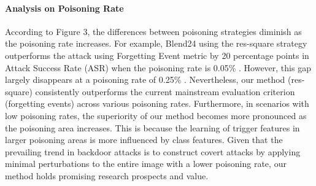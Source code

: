 \documentclass{article}
\begin{document}
\paragraph{Analysis on Poisoning Rate}
According to Figure 3, the differences between poisoning strategies diminish as the poisoning rate increases. For example, Blend24 using the res-square strategy outperforms the attack using Forgetting Event metric by 20 percentage points in Attack Success Rate (ASR) when the poisoning rate is 0.05\% . However, this gap largely disappears at a poisoning rate of 0.25\% . Nevertheless, our method (res-square) consistently outperforms the current mainstream evaluation criterion (forgetting events) across various poisoning rates. Furthermore, in scenarios with low poisoning rates, the superiority of our method becomes more pronounced as the poisoning area increases. This is because the learning of trigger features in larger poisoning areas is more influenced by class features. Given that the prevailing trend in backdoor attacks is to construct covert attacks by applying minimal perturbations to the entire image with a lower poisoning rate, our method holds promising research prospects and value.
\end{document}
